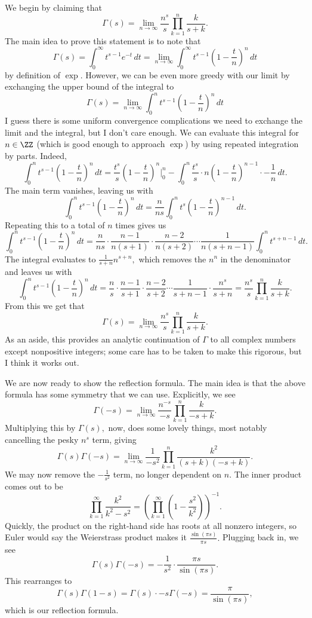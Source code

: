 We begin by claiming that
\[\Gamma(s)=\lim_{n\to\infty}\frac{n^s}s\prod_{k=1}^n\frac k{s+k}.\]
The main idea to prove this statement is to note that
\[\Gamma(s)=\int_0^\infty t^{s-1}e^{-t}\,dt=\lim_{n\to\infty}\int_0^\infty t^{s-1}\left(1-\frac tn\right)^n\,dt\]
by definition of $\exp.$ However, we can be even more greedy with our limit by exchanging the upper bound of the integral to
\[\Gamma(s)=\lim_{n\to\infty}\int_0^nt^{s-1}\left(1-\frac tn\right)^n\,dt\]
I guess there is some uniform convergence complications we need to exchange the limit and the integral, but I don't care enough. We can evaluate this integral for $n\in\ZZ$ (which is good enough to approach $\exp$) by using repeated integration by parts. Indeed,
\[\int_0^nt^{s-1}\left(1-\frac tn\right)^n\,dt=\frac{t^s}s\left(1-\frac tn\right)^n\bigg|_0^n-\int_0^n\frac{t^s}s\cdot n\left(1-\frac tn\right)^{n-1}\cdot-\frac1n\,dt.\]
The main term vanishes, leaving us with
\[\int_0^nt^{s-1}\left(1-\frac tn\right)^n\,dt=\frac n{ns}\int_0^nt^s\left(1-\frac tn\right)^{n-1}\,dt.\]
Repeating this to a total of $n$ times gives us
\[\int_0^nt^{s-1}\left(1-\frac tn\right)^n\,dt=\frac n{ns}\cdot\frac{n-1}{n(s+1)}\cdot\frac{n-2}{n(s+2)}\cdots\frac1{n(s+n-1)}\int_0^nt^{s+n-1}\,dt.\]
The integral evaluates to $\frac1{s+n}n^{s+n},$ which removes the $n^n$ in the denominator and leaves us with
\[\int_0^nt^{s-1}\left(1-\frac tn\right)^n\,dt=\frac ns\cdot\frac{n-1}{s+1}\cdot\frac{n-2}{s+2}\cdots\frac1{s+n-1}\cdot\frac{n^s}{s+n}=\frac{n^s}s\prod_{k=1}^n\frac k{s+k}.\]
From this we get that
\[\Gamma(s)=\lim_{n\to\infty}\frac{n^s}s\prod_{k=1}^n\frac k{s+k}.\]
As an aside, this provides an analytic continuation of $\Gamma$ to all complex numbers except nonpositive integers; some care has to be taken to make this rigorous, but I think it works out.

We are now ready to show the reflection formula. The main idea is that the above formula has some symmetry that we can use. Explicitly, we see
\[\Gamma(-s)=\lim_{n\to\infty}\frac{n^{-s}}{-s}\prod_{k=1}^n\frac k{-s+k}.\]
Multiplying this by $\Gamma(s),$ now, does some lovely things, most notably cancelling the pesky $n^s$ term, giving
\[\Gamma(s)\Gamma(-s)=\lim_{n\to\infty}\frac1{-s^2}\prod_{k=1}^n\frac{k^2}{(s+k)(-s+k)}.\]
We may now remove the $-\frac1{s^2}$ term, no longer dependent on $n.$ The inner product comes out to be
\[\prod_{k=1}^\infty\frac{k^2}{k^2-s^2}=\left(\prod_{k=1}^\infty\left(1-\frac{s^2}{k^2}\right)\right)^{-1}.\]
Quickly, the product on the right-hand side has roots at all nonzero integers, so Euler would say the Weierstrass product makes it $\frac{\sin(\pi s)}{\pi s}.$ Plugging back in, we see
\[\Gamma(s)\Gamma(-s)=-\frac1{s^2}\cdot\frac{\pi s}{\sin(\pi s)}.\]
This rearranges to
\[\Gamma(s)\Gamma(1-s)=\Gamma(s)\cdot-s\Gamma(-s)=\frac\pi{\sin(\pi s)},\]
which is our reflection formula.

